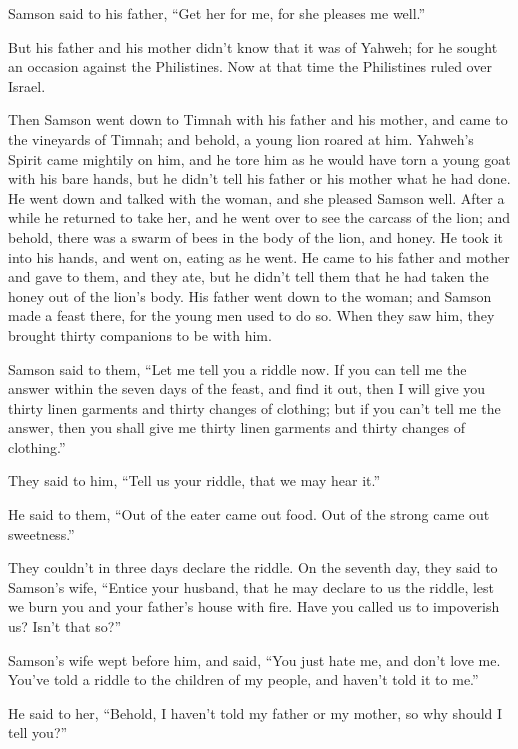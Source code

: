 Samson said to his father, ``Get her for me, for she pleases me well.''

 But his father and his mother didn't know that it was of
Yahweh; for he sought an occasion against the Philistines. Now at that
time the Philistines ruled over Israel.

 Then Samson went down to Timnah with his father and his
mother, and came to the vineyards of Timnah; and behold, a young lion
roared at him.  Yahweh's Spirit came mightily on him, and
he tore him as he would have torn a young goat with his bare hands, but
he didn't tell his father or his mother what he had done. 
He went down and talked with the woman, and she pleased Samson well.
 After a while he returned to take her, and he went over
to see the carcass of the lion; and behold, there was a swarm of bees in
the body of the lion, and honey.  He took it into his
hands, and went on, eating as he went. He came to his father and mother
and gave to them, and they ate, but he didn't tell them that he had
taken the honey out of the lion's body.  His father went
down to the woman; and Samson made a feast there, for the young men used
to do so.  When they saw him, they brought thirty
companions to be with him.

 Samson said to them, ``Let me tell you a riddle now. If
you can tell me the answer within the seven days of the feast, and find
it out, then I will give you thirty linen garments and thirty changes of
clothing;  but if you can't tell me the answer, then you
shall give me thirty linen garments and thirty changes of clothing.''

They said to him, ``Tell us your riddle, that we may hear it.''

 He said to them, ``Out of the eater came out food. Out
of the strong came out sweetness.''

They couldn't in three days declare the riddle.  On the
seventh day, they said to Samson's wife, ``Entice your husband, that he
may declare to us the riddle, lest we burn you and your father's house
with fire. Have you called us to impoverish us? Isn't that so?''

 Samson's wife wept before him, and said, ``You just hate
me, and don't love me. You've told a riddle to the children of my
people, and haven't told it to me.''

He said to her, ``Behold, I haven't told my father or my mother, so why
should I tell you?''

